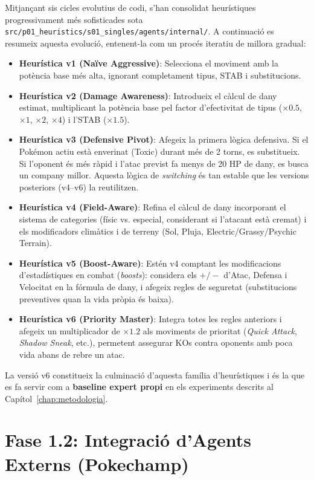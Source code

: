 Mitjançant sis cicles evolutius de codi, s'han consolidat heurístiques progressivament més sofisticades sota \texttt{src/p01\_heuristics/s01\_singles/agents/internal/}. A continuació es resumeix aquesta evolució, entenent-la com un procés iteratiu de millora gradual:

\begin{itemize}
    \item \textbf{Heurística v1 (Naïve Aggressive)}: Selecciona el moviment amb la potència base més alta, ignorant completament tipus, STAB i substitucions.
    \item \textbf{Heurística v2 (Damage Awareness)}: Introdueix el càlcul de dany estimat, multiplicant la potència base pel factor d'efectivitat de tipus ($\times 0.5$, $\times 1$, $\times 2$, $\times 4$) i l'STAB ($\times 1.5$).
    \item \textbf{Heurística v3 (Defensive Pivot)}: Afegeix la primera lògica defensiva. Si el Pokémon actiu està enverinat (Toxic) durant més de 2 torns, es substitueix. Si l'oponent és més ràpid i l'atac previst fa menys de 20 HP de dany, es busca un company millor. Aquesta lògica de \textit{switching} és tan estable que les versions posteriors (v4--v6) la reutilitzen.
    \item \textbf{Heurística v4 (Field-Aware)}: Refina el càlcul de dany incorporant el sistema de categories (físic vs. especial, considerant si l'atacant està cremat) i els modificadors climàtics i de terreny (Sol, Pluja, Electric/Grassy/Psychic Terrain).
    \item \textbf{Heurística v5 (Boost-Aware)}: Estén v4 comptant les modificacions d'estadístiques en combat (\textit{boosts}): considera els $+/-$ d'Atac, Defensa i Velocitat en la fórmula de dany, i afegeix regles de seguretat (substitucions preventives quan la vida pròpia és baixa).
    \item \textbf{Heurística v6 (Priority Master)}: Integra totes les regles anteriors i afegeix un multiplicador de $\times 1.2$ als moviments de prioritat (\textit{Quick Attack}, \textit{Shadow Sneak}, etc.), permetent assegurar KOs contra oponents amb poca vida abans de rebre un atac.
\end{itemize}

La versió v6 constitueix la culminació d'aquesta família d'heurístiques i és la que es fa servir com a \textbf{baseline expert propi} en els experiments descrits al Capítol~\ref{chap:metodologia}.


\section{Fase 1.2: Integració d'Agents Externs (Pokechamp)}
\label{sec:pokechamp_integracio}

